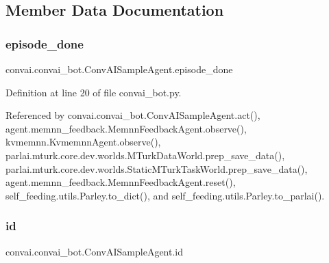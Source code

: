 \subsection{Member Data Documentation}
\mbox{\label{classconvai_1_1convai__bot_1_1ConvAISampleAgent_acffaf8a30b1593391c4b29fadb5b8275}} 
\subsubsection{\texorpdfstring{episode\+\_\+done}{episode\_done}}
{\footnotesize\ttfamily convai.\+convai\+\_\+bot.\+Conv\+A\+I\+Sample\+Agent.\+episode\+\_\+done}



Definition at line 20 of file convai\+\_\+bot.\+py.



Referenced by convai.\+convai\+\_\+bot.\+Conv\+A\+I\+Sample\+Agent.\+act(), agent.\+memnn\+\_\+feedback.\+Memnn\+Feedback\+Agent.\+observe(), kvmemnn.\+Kvmemnn\+Agent.\+observe(), parlai.\+mturk.\+core.\+dev.\+worlds.\+M\+Turk\+Data\+World.\+prep\+\_\+save\+\_\+data(), parlai.\+mturk.\+core.\+dev.\+worlds.\+Static\+M\+Turk\+Task\+World.\+prep\+\_\+save\+\_\+data(), agent.\+memnn\+\_\+feedback.\+Memnn\+Feedback\+Agent.\+reset(), self\+\_\+feeding.\+utils.\+Parley.\+to\+\_\+dict(), and self\+\_\+feeding.\+utils.\+Parley.\+to\+\_\+parlai().

\mbox{\label{classconvai_1_1convai__bot_1_1ConvAISampleAgent_ac1ae3f5ce58f6617004ea799999135d7}} 
\subsubsection{\texorpdfstring{id}{id}}
{\footnotesize\ttfamily convai.\+convai\+\_\+bot.\+Conv\+A\+I\+Sample\+Agent.\+id}



